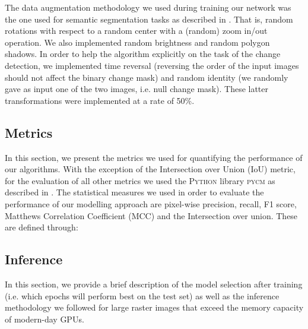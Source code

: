 \documentclass[times, 5p]{elsarticle}
\begin{document}
The data augmentation methodology we used during training our network was the one used for semantic segmentation tasks as described in \cite{DIAKOGIANNIS202094}. That is, random rotations with respect to a random center with a (random) zoom in/out operation. We also implemented random brightness and  random polygon shadows. In order to help the algorithm explicitly on the task of the change detection, we implemented time reversal (reversing the order of the input images should not affect the binary change mask) and random identity (we randomly gave as input one of the two images, i.e. null change mask). These latter transformations were implemented at a rate of 50\%.  



\subsection{Metrics}
In this section, we present the metrics we used for quantifying the performance of our algorithms. With the exception of the Intersection over Union (IoU) metric, for the evaluation of all other metrics we used the \textsc{Python} library \textsc{pycm} as described in \cite{Haghighi2018}. The statistical measures we used in order to evaluate the performance of our modelling approach are pixel-wise precision, recall, F1 score, Matthews Correlation Coefficient (MCC) \citep{MATTHEWS1975442} and the Intersection over union. These are defined through: 


\begin{comment}  
 For the case of binary masks and predictions in images, i.e. , where  and  denote the height and width of images,  represents the binary vector of predictions, and  the ground truth mask.  For each pair of ground truth mask and predicted mask, we evaluate:

For two sets, , , the intersection over union (IoU) is defined through the set operations:

translating this formula to 2-dimensional binary predictions, , and ground truth labels, , reads: 

note that the last formula is numerically equivalent to its statistical version:
\end{comment}


\subsection{Inference}


In this section, we provide a brief description of the model selection after training (i.e. which epochs will perform best on the test set) as well as the inference methodology we followed for large raster images that exceed the memory capacity of modern-day GPUs. 
\end{document}
